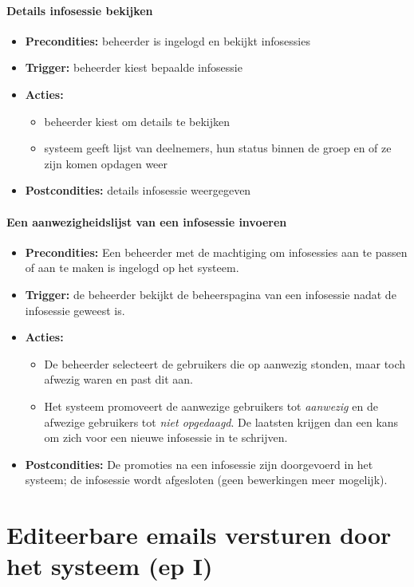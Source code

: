 \documentclass[]{article}
\begin{document}
\subsection{Details infosessie bekijken}
\begin{itemize}
\item \textbf{Precondities:} beheerder is ingelogd en bekijkt infosessies
\item \textbf{Trigger:} beheerder kiest bepaalde infosessie
\item \textbf{Acties:} \begin{itemize}
\item	beheerder kiest om details te bekijken
\item 	systeem geeft lijst van deelnemers, hun status binnen de groep en of ze zijn komen opdagen weer
\end{itemize}
\item \textbf{Postcondities:} details infosessie weergegeven
\end{itemize}

\subsection{Een aanwezigheidslijst van een infosessie invoeren}
\begin{itemize}
\item \textbf{Precondities:} Een beheerder met de machtiging om infosessies aan te passen of aan te maken is ingelogd op het systeem.
\item \textbf{Trigger:} de beheerder bekijkt de beheerspagina van een infosessie nadat de infosessie geweest is.
\item \textbf{Acties:} 
\begin{itemize}
	\item	De beheerder selecteert de gebruikers die op aanwezig stonden, maar toch afwezig waren en past dit aan.
	\item	Het systeem promoveert de aanwezige gebruikers tot \emph{aanwezig} en de afwezige gebruikers tot \emph{niet opgedaagd}. De laatsten krijgen dan een kans om zich voor een nieuwe infosessie in te schrijven.
\end{itemize}
\item \textbf{Postcondities:} De promoties na een infosessie zijn doorgevoerd in het systeem; de infosessie wordt afgesloten (geen bewerkingen meer mogelijk).
\end{itemize}

\part{Editeerbare emails versturen door het systeem (ep I)}
\end{document}
